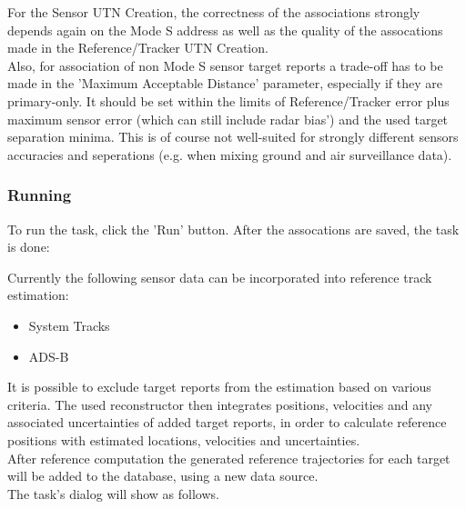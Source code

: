 For the Sensor UTN Creation, the correctness of the associations strongly depends again on the Mode S address as well as the quality of the assocations made in the Reference/Tracker UTN Creation. \\

Also, for association of non Mode S sensor target reports a trade-off has to be made in the 'Maximum Acceptable Distance' parameter, especially if they are primary-only. It should be set within the limits of Reference/Tracker error plus maximum sensor error (which can still include radar bias') and the used target separation minima. This is of course not well-suited for strongly different sensors accuracies and seperations (e.g. when mixing ground and air surveillance data). \\

\subsubsection{Running}

To run the task, click the 'Run' button. After the assocations are saved, the task is done:


Currently the following sensor data can be incorporated into reference track estimation:

\begin{itemize}
    \item System Tracks
    \item ADS-B \\
\end{itemize}

It is possible to exclude target reports from the estimation based on various criteria. 
The used reconstructor then integrates positions, velocities and any associated uncertainties of 
added target reports, in order to calculate reference positions with estimated locations, velocities and uncertainties. \\

After reference computation the generated reference trajectories for each target will be added to the database, 
using a new data source. \\

The task's dialog will show as follows. \\


